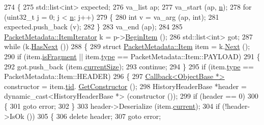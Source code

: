 \begin{DoxyCode}
274 \{
275   std::list<int> expected;
276   va\_list ap;
277   va\_start (ap, \hyperlink{namespacesample-rng-plot_aeb5ee5c431e338ef39b7ac5431242e1d}{n});
278   \textcolor{keywordflow}{for} (uint32\_t j = 0; j < \hyperlink{namespacesample-rng-plot_aeb5ee5c431e338ef39b7ac5431242e1d}{n}; j++)
279     \{
280       \textcolor{keywordtype}{int} v = va\_arg (ap, \textcolor{keywordtype}{int});
281       expected.push\_back (v);
282     \}
283   va\_end (ap);
284 
285   \hyperlink{classns3_1_1PacketMetadata_1_1ItemIterator}{PacketMetadata::ItemIterator} k = p->\hyperlink{classns3_1_1Packet_a0951ffaa12e116b03c4888085280501d}{BeginItem} ();
286   std::list<int> got;
287   \textcolor{keywordflow}{while} (k.\hyperlink{classns3_1_1PacketMetadata_1_1ItemIterator_abc9348e790ef50100bc1c26a9faf025b}{HasNext} ())
288     \{
289       \textcolor{keyword}{struct }\hyperlink{structns3_1_1PacketMetadata_1_1Item}{PacketMetadata::Item} item = k.\hyperlink{classns3_1_1PacketMetadata_1_1ItemIterator_a3d59a1673dca4338f41d3c788ccd3e10}{Next} ();
290       \textcolor{keywordflow}{if} (item.\hyperlink{structns3_1_1PacketMetadata_1_1Item_a26a638c974e533c90a41687217df2574}{isFragment} || item.\hyperlink{structns3_1_1PacketMetadata_1_1Item_a76d4fe6402891fd8d840442d51b0f6a0}{type} == PacketMetadata::Item::PAYLOAD)
291         \{
292           got.push\_back (item.\hyperlink{structns3_1_1PacketMetadata_1_1Item_afe99c84baf1db382630fab75a464fc63}{currentSize});
293           \textcolor{keywordflow}{continue};
294         \}
295       \textcolor{keywordflow}{if} (item.\hyperlink{structns3_1_1PacketMetadata_1_1Item_a76d4fe6402891fd8d840442d51b0f6a0}{type} == PacketMetadata::Item::HEADER)
296         \{
297           \hyperlink{classns3_1_1Callback}{Callback<ObjectBase *>} constructor = item.\hyperlink{structns3_1_1PacketMetadata_1_1Item_a07dac03d1aa1be885295bdfd113f78e7}{tid}.
      \hyperlink{classns3_1_1TypeId_ad9b0bc71ee7593a1ff23ff8d53938e95}{GetConstructor} ();
298           HistoryHeaderBase *header = \textcolor{keyword}{dynamic\_cast<}HistoryHeaderBase *\textcolor{keyword}{>} (constructor ());
299           \textcolor{keywordflow}{if} (header == 0)
300             \{
301               \textcolor{keywordflow}{goto} error;
302             \}
303           header->Deserialize (item.\hyperlink{structns3_1_1PacketMetadata_1_1Item_aa8c1eed1363b2965204125b91659f639}{current});
304           \textcolor{keywordflow}{if} (!header->IsOk ())
305             \{
306               \textcolor{keyword}{delete} header;
307               \textcolor{keywordflow}{goto} error;

\end{DoxyCode}
